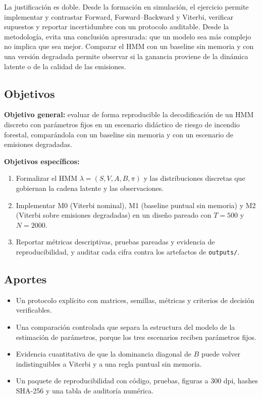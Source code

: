 \documentclass[11pt,letterpaper]{article}
\begin{document}
La justificación es doble. Desde la formación en simulación, el ejercicio permite implementar y contrastar Forward, Forward--Backward y Viterbi, verificar supuestos y reportar incertidumbre con un protocolo auditable. Desde la metodología, evita una conclusión apresurada: que un modelo sea más complejo no implica que sea mejor. Comparar el HMM con un baseline sin memoria y con una versión degradada permite observar si la ganancia proviene de la dinámica latente o de la calidad de las emisiones.

\subsection{Objetivos}

\textbf{Objetivo general:} evaluar de forma reproducible la decodificación de un HMM discreto con parámetros fijos en un escenario didáctico de riesgo de incendio forestal, comparándola con un baseline sin memoria y con un escenario de emisiones degradadas.

\textbf{Objetivos específicos:}
\begin{enumerate}
  \item Formalizar el HMM \(\lambda=(S,V,A,B,\pi)\) y las distribuciones discretas que gobiernan la cadena latente y las observaciones.
  \item Implementar M0 (Viterbi nominal), M1 (baseline puntual sin memoria) y M2 (Viterbi sobre emisiones degradadas) en un diseño pareado con \(T=500\) y \(N=2000\).
  \item Reportar métricas descriptivas, pruebas pareadas y evidencia de reproducibilidad, y auditar cada cifra contra los artefactos de \texttt{outputs/}.
\end{enumerate}

\subsection{Aportes}

\begin{itemize}
  \item Un protocolo explícito con matrices, semillas, métricas y criterios de decisión verificables.
  \item Una comparación controlada que separa la estructura del modelo de la estimación de parámetros, porque los tres escenarios reciben parámetros fijos.
  \item Evidencia cuantitativa de que la dominancia diagonal de \(B\) puede volver indistinguibles a Viterbi y a una regla puntual sin memoria.
  \item Un paquete de reproducibilidad con código, pruebas, figuras a 300 dpi, hashes SHA-256 y una tabla de auditoría numérica.
\end{itemize}
\end{document}
